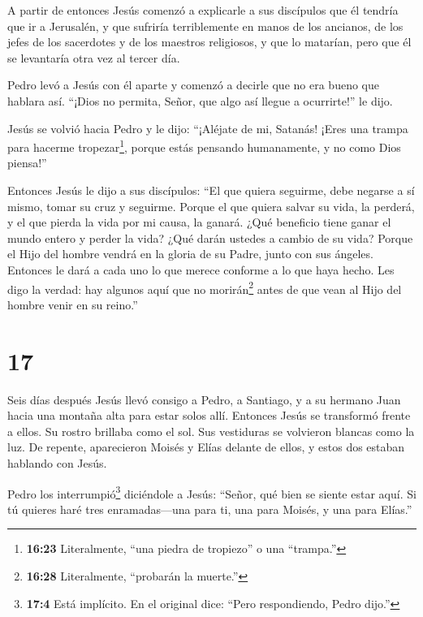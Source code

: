  A partir de entonces Jesús comenzó a explicarle a sus
discípulos que él tendría que ir a Jerusalén, y que sufriría
terriblemente en manos de los ancianos, de los jefes de los sacerdotes y
de los maestros religiosos, y que lo matarían, pero que él se levantaría
otra vez al tercer día.

 Pedro levó a Jesús con él aparte y comenzó a decirle que
no era bueno que hablara así. ``¡Dios no permita, Señor, que algo así
llegue a ocurrirte!'' le dijo.

 Jesús se volvió hacia Pedro y le dijo: ``¡Aléjate de mi,
Satanás! ¡Eres una trampa para hacerme tropezar\footnote{\textbf{16:23}
  Literalmente, ``una piedra de tropiezo'' o una ``trampa.''}, porque
estás pensando humanamente, y no como Dios piensa!''

 Entonces Jesús le dijo a sus discípulos: ``El que quiera
seguirme, debe negarse a sí mismo, tomar su cruz y seguirme.
 Porque el que quiera salvar su vida, la perderá, y el que
pierda la vida por mi causa, la ganará.  ¿Qué beneficio
tiene ganar el mundo entero y perder la vida? ¿Qué darán ustedes a
cambio de su vida?  Porque el Hijo del hombre vendrá en la
gloria de su Padre, junto con sus ángeles. Entonces le dará a cada uno
lo que merece conforme a lo que haya hecho.  Les digo la
verdad: hay algunos aquí que no morirán\footnote{\textbf{16:28}
  Literalmente, ``probarán la muerte.''} antes de que vean al Hijo del
hombre venir en su reino.''

\hypertarget{section-16}{%
\section{17}\label{section-16}}

 Seis días después Jesús llevó consigo a Pedro, a Santiago,
y a su hermano Juan hacia una montaña alta para estar solos allí.
 Entonces Jesús se transformó frente a ellos. Su rostro
brillaba como el sol. Sus vestiduras se volvieron blancas como la luz.
 De repente, aparecieron Moisés y Elías delante de ellos, y
estos dos estaban hablando con Jesús.

 Pedro los interrumpió\footnote{\textbf{17:4} Está
  implícito. En el original dice: ``Pero respondiendo, Pedro dijo.''}
diciéndole a Jesús: ``Señor, qué bien se siente estar aquí. Si tú
quieres haré tres enramadas---una para ti, una para Moisés, y una para
Elías.''

